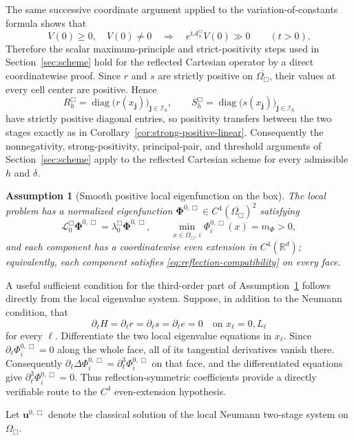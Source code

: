 \documentclass[11pt]{article}
\newtheorem{assumption}[theorem]{Assumption}
\theoremstyle{definition}
\newcommand{\R}{\mathbb{R}}
\newcommand{\cL}{\mathcal{L}}
\newcommand{\diag}{\operatorname{diag}}
\newcommand{\uvec}{\bm u}
\newcommand{\PhiV}{\bm\Phi}
\newcommand{\jj}{\bm j}
\begin{document}
The same successive coordinate argument applied to the variation-of-constants
formula shows that
\[
 V(0)\ge0,\quad V(0)\ne0
 \quad\Longrightarrow\quad
 e^{t\mathcal A_h^{\Box}}V(0)\gg0
 \qquad(t>0).
\]
Therefore the scalar maximum-principle and strict-positivity steps used in
Section~\ref{sec:scheme} hold for the reflected Cartesian operator by a direct
coordinatewise proof.  Since $r$ and $s$ are strictly positive on
$\overline{\Omega_{\Box}}$, their values at every cell center are positive.
Hence
\[
R_h^{\Box}=\diag\big(r(x_{\jj})\big)_{\jj\in\mathcal I_h},
\qquad
S_h^{\Box}=\diag\big(s(x_{\jj})\big)_{\jj\in\mathcal I_h}
\]
have strictly positive diagonal entries, so positivity transfers between the
two stages exactly as in Corollary~\ref{cor:strong-positive-linear}.  Consequently the nonnegativity,
strong-positivity, principal-pair, and threshold arguments of
Section~\ref{sec:scheme} apply to the reflected Cartesian scheme for every
admissible $h$ and $\delta$.


\begin{assumption}[Smooth positive local eigenfunction on the box]
\label{ass:eigenfunction}
The local problem has a normalized eigenfunction $\PhiV^{0,\Box}\in C^4(\overline{\Omega_{\Box}})^2$ satisfying
\[
 \cL_0^{\Box}\PhiV^{0,\Box}=\lambda_0^{\Box}\PhiV^{0,\Box},
 \qquad
 \min_{x\in\overline{\Omega_{\Box}},\,i}\Phi_i^{0,\Box}(x)=m_\Phi>0,
\]
and each component has a coordinatewise even extension in $C^4(\R^d)$; equivalently, each component satisfies \eqref{eq:reflection-compatibility} on every face.
\end{assumption}

A useful sufficient condition for the third-order part of
Assumption~\ref{ass:eigenfunction} follows directly from the local eigenvalue
system.  Suppose, in addition to the Neumann condition, that
\[
 \partial_\ell H=\partial_\ell r=\partial_\ell s=\partial_\ell e=0
 \quad\text{on }x_\ell=0,L_\ell
\]
for every $\ell$.  Differentiate the two local eigenvalue equations in
$x_\ell$.  Since $\partial_\ell\Phi_i^{0,\Box}=0$ along the whole face, all of
its tangential derivatives vanish there.  Consequently
$\partial_\ell\Delta\Phi_i^{0,\Box}=\partial_\ell^3\Phi_i^{0,\Box}$ on that
face, and the differentiated equations give
$\partial_\ell^3\Phi_i^{0,\Box}=0$.  Thus reflection-symmetric coefficients
provide a directly verifiable route to the $C^4$ even-extension hypothesis.

Let $\uvec^{0,\Box}$ denote the classical solution of the local Neumann two-stage system on $\Omega_{\Box}$.
\end{document}

